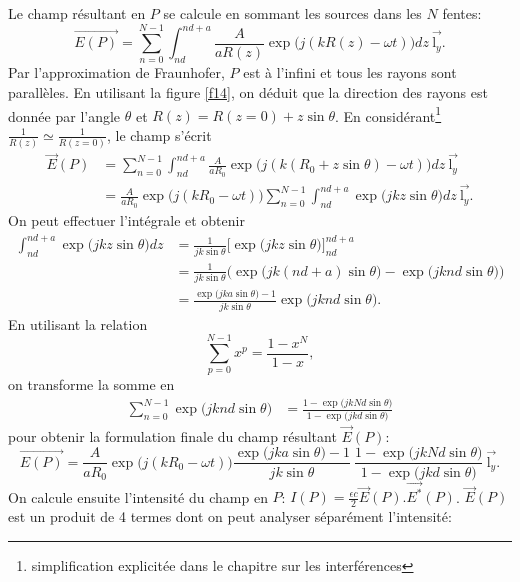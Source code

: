 \noindent Le champ résultant en $P$ se calcule en sommant les sources dans les $N$ fentes:
$$
  \overset\rightarrow{E(P)}=\sum_{n=0}^{N-1}\int_{nd}^{nd+a}\frac{A}{aR(z)}\exp\big(j(kR(z)-\omega t)\big)dz\:\overset\rightarrow{\mbox{l}_y}.
$$
Par l'approximation de Fraunhofer, $P$ est à l'infini et tous les rayons sont parallèles. En utilisant la figure \ref{f14}, on déduit que la direction des rayons est donnée par l'angle $\theta$ et 
$R(z)=R(z=0)+z\sin \theta$. En considérant\footnote{simplification explicitée dans le chapitre sur les interférences} $\frac{1}{R(z)}\simeq\frac{1}{R(z=0)}$,
le champ s'écrit
\begin{align*}
\overset\rightarrow{E}(P) & = \sum_{n=0}^{N-1}\int_{nd}^{nd+a}\frac{A}{aR_0}\exp\big(j(k(R_0+z\sin \theta)-\omega t)\big)dz\:\overset\rightarrow{\mbox{l}_y}\\
 &= \frac{A}{aR_0}\exp\big(j(kR_0-\omega t)\big)\sum_{n=0}^{N-1}\int_{nd}^{nd+a}\exp\big(jkz\sin \theta\big)dz\:\overset\rightarrow{\mbox{l}_y}.
\end{align*}
On peut effectuer l'intégrale et obtenir
\begin{align*}
\int_{nd}^{nd+a}\exp\big(jkz\sin \theta\big)dz & =\frac{1}{jk\sin\theta}\Big[\exp\big(jkz\sin \theta\big)\Big]_{nd}^{nd+a}\\
&=\frac{1}{jk\sin\theta}\bigg(\exp\big(jk(nd+a)\sin \theta\big)-\exp\big(jknd\sin \theta\big) \bigg)\\
&=\frac{\exp\big(jka\sin \theta\big)-1 }{jk\sin\theta}\exp\big(jknd\sin \theta\big).
\end{align*}
En utilisant la relation
$$\sum\limits_{p=0}^{N-1} x^p=\frac{1-x^N}{1-x}, $$
on transforme la somme en
\begin{align*}
\sum_{n=0}^{N-1}\exp\big(jknd\sin \theta\big)&=\frac{1-\exp\big(jkNd\sin \theta\big)}{1-\exp\big(jkd\sin \theta\big)}
\end{align*}
pour obtenir la formulation finale du champ résultant $\overset\rightarrow{E}(P)$:
$$
  \overset\rightarrow{E(P)}=\frac{A}{aR_0}\exp\big(j(kR_0-\omega t)\big)\frac{\exp\big(jka\sin \theta\big)-1 }{jk\sin\theta}\:\frac{1-\exp\big(jkNd\sin \theta\big)}{1-\exp\big(jkd\sin \theta\big)}  \:\overset\rightarrow{\mbox{l}_y}.
$$
On calcule ensuite l'intensité du champ en $P$: $I(P)=\frac{\epsilon c}{2}\overset\rightarrow{E}(P).\overset\rightarrow{E^*}(P)$. $\overset\rightarrow{E}(P)$ est un produit de 4 termes dont on peut analyser séparément l'intensité:

